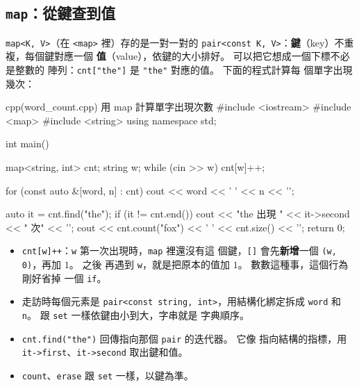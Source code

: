 \subsection{\texttt{map}：從鍵查到值}

\texttt{map<K, V>}（在 \texttt{<map>} 裡）存的是一對一對的
\texttt{pair<const K, V>}：\textbf{鍵}（key）不重複，每個鍵對應一個
\textbf{值}（value），依鍵的大小排好。 可以把它想成一個下標不必是整數的
陣列：\texttt{cnt["the"]} 是 \texttt{"the"} 對應的值。 下面的程式計算每
個單字出現幾次：

\begin{example}[label=ex:word-count]{cpp}{(word\_count.cpp) 用 map 計算單字出現次數}
#include <iostream>
#include <map>
#include <string>
using namespace std;

int main() {
    map<string, int> cnt;
    string w;
    while (cin >> w) {
        cnt[w]++;
    }

    for (const auto &[word, n] : cnt) {
        cout << word << ' ' << n << '\n';
    }

    auto it = cnt.find("the");
    if (it != cnt.end()) {
        cout << "the 出現 " << it->second << " 次" << '\n';
    }
    cout << cnt.count("fox") << ' ' << cnt.size() << '\n';
    return 0;
}
\end{example}


\begin{itemize}
\item \texttt{cnt[w]++}：\texttt{w} 第一次出現時，\texttt{map} 裡還沒有這
個鍵，\texttt{[]} 會先\textbf{新增}一個 \texttt{(w, 0)}，再加 $1$。 之後
再遇到 \texttt{w}，就是把原本的值加 $1$。 數數這種事，這個行為剛好省掉
一個 \texttt{if}。
\item 走訪時每個元素是 \texttt{pair<const string, int>}，用結構化綁定拆成
\texttt{word} 和 \texttt{n}。 跟 \texttt{set} 一樣依鍵由小到大，字串就是
字典順序。
\item \texttt{cnt.find("the")} 回傳指向那個 \texttt{pair} 的迭代器。 它像
指向結構的指標，用 \texttt{it->first}、\texttt{it->second} 取出鍵和值。
\item \texttt{count}、\texttt{erase} 跟 \texttt{set} 一樣，以鍵為準。
\end{itemize}

